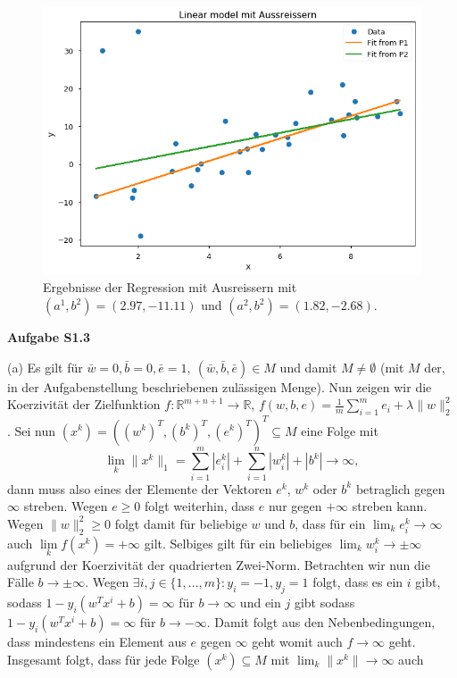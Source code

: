 \documentclass[ngerman, a4paper,12pt]{article}
\begin{document}
\begin{figure}[h]
	\centering
	\includegraphics[width=0.8\columnwidth]{21d.png}
	\caption{\label{fig:21d} Ergebnisse der Regression mit Ausreissern mit $(a^1, b^2) = (2.97, -11.11)$ und $(a^2, b^2) = (1.82, -2.68)$.}
\end{figure}
\textbf{Aufgabe S1.3} \par
(a) Es gilt für $\bar{w}=0, \bar{b}=0, \bar{e}=1, \ (\bar{w}, \bar{b}, \bar{e}) \in M$ und damit $M\neq \emptyset$ (mit $M$ der, in der Aufgabenstellung beschriebenen zulässigen Menge). Nun zeigen wir die Koerzivität der Zielfunktion $f: \mathbb{R}^{m+n+1} \rightarrow \mathbb{R}$, $f(w,b,e) = \frac{1}{m} \sum_{i=1}^{m}e_i + \lambda \|w \|_2^2$. Sei nun $(x^k) = ( (w^k)^T, (b^k)^T, (e^k)^T)^T \subseteq M$ eine Folge mit 
\begin{equation}
	\lim\limits_{k} \| x^k \|_1 = \sum_{i=1}^{m}|e_i^k| + \sum_{i=1}^{n} |w_i^k| + |b^k|  \rightarrow \infty,
\end{equation}
dann muss also eines der Elemente der Vektoren $e^k$, $w^k$ oder $b^k$ betraglich gegen $\infty$ streben. Wegen $e \geq 0$ folgt weiterhin, dass $e$ nur gegen $+ \infty$ streben kann. Wegen $\| w \|_2^2 \geq 0$ folgt damit für beliebige $w$ und $b$, dass für ein $\lim_k e_i^k \rightarrow \infty$ auch $\lim\limits_{k} f(x^k) = + \infty$ gilt. Selbiges gilt für ein beliebiges $\lim_k w_i^k \rightarrow \pm \infty$ aufgrund der Koerzivität der quadrierten Zwei-Norm. Betrachten wir nun die Fälle $b \rightarrow \pm \infty$. Wegen $\exists i,j \in \{1,...,m \} : y_i = -1, y_j = 1$ folgt, dass es ein $i$ gibt, sodass $1 - y_i (w^Tx^i + b) = \infty$ für $b \rightarrow \infty$ und ein $j$ gibt sodass $1 - y_i (w^Tx^i + b) = \infty$ für $b \rightarrow -\infty$. Damit folgt aus den Nebenbedingungen, dass mindestens ein Element aus $e$ gegen $\infty$ geht womit auch $f \rightarrow \infty$ geht. Insgesamt folgt, dass für jede Folge $(x^k) \subseteq M$ mit $\lim_k \| x^k \| \rightarrow \infty$ auch
\end{document}
